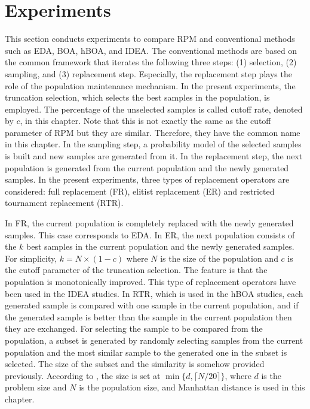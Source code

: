 \section{Experiments}
\label{exp-rpm}
This section conducts experiments to compare RPM
and conventional methods such as EDA, BOA, hBOA, and IDEA.
The conventional methods are based on the common framework
that iterates the following three steps:
(1) selection,
(2) sampling, and
(3) replacement step.
Especially, the replacement step plays the role of 
the population maintenance mechanism.
In the present experiments,
the truncation selection,
which selects the best samples in the population,
is employed.
The percentage of the unselected samples is
called cutoff rate, denoted by $c$, in this chapter.
Note that this is not exactly the same as the cutoff parameter of RPM
but they are similar. Therefore, they have the common name in this chapter.
In the sampling step,
a probability model of the selected samples is built
and new samples are generated from it.
In the replacement step,
the next population is generated from
the current population and the newly generated samples.
In the present experiments, 
three types of replacement operators are considered:
full replacement (FR), elitist replacement (ER) and
restricted tournament replacement (RTR).

In FR,
the current population is completely replaced with
the newly generated samples.
This case corresponds to EDA.
In ER, the next population consists of
the $k$ best samples in the current population 
and the newly generated samples.
For simplicity, $k=N\times(1-c)$ where $N$ is the size of the population
and $c$ is the cutoff parameter of the truncation selection.
The feature is that the population is monotonically improved.
This type of replacement operators have been used in the IDEA studies.
In RTR, which is used in the hBOA studies,
each generated sample is compared with one sample in the current
population, and
if the generated sample is better than the sample in the current
population then they are exchanged.
For selecting the sample to be compared from the population,
a subset is generated by randomly selecting samples 
from the current population
and the most similar sample to the generated one in the subset is
selected.
The size of the subset and
the similarity is somehow provided previously.
According to \cite{lima:replacement},
the size is set at $\min \{d, \lceil N/20 \rceil \}$, 
where $d$ is the problem size and
$N$ is the population size, and
Manhattan distance is used in this chapter.


